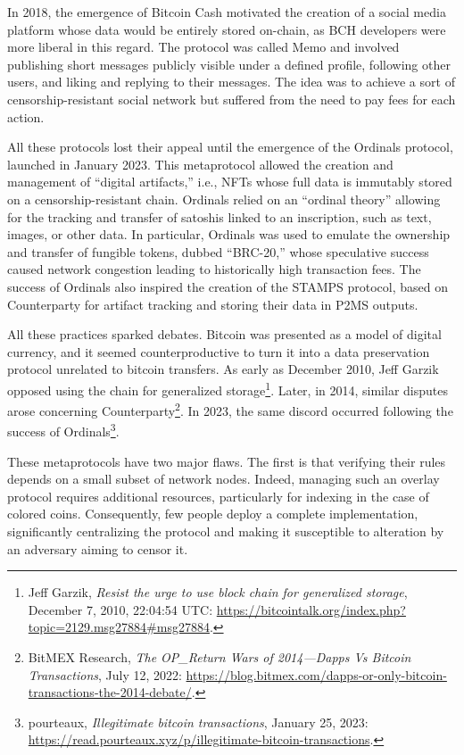 \documentclass[
  a5paper,
  smalldemyvopaper,10pt,twoside,onecolumn,openright,extrafontsizes,hidelinks]{memoir}
\begin{document}
In 2018, the emergence of Bitcoin Cash motivated the creation of a
social media platform whose data would be entirely stored on-chain, as
BCH developers were more liberal in this regard. The protocol was called
Memo and involved publishing short messages publicly visible under a
defined profile, following other users, and liking and replying to their
messages. The idea was to achieve a sort of censorship-resistant social
network but suffered from the need to pay fees for each action.

All these protocols lost their appeal until the emergence of the
Ordinals protocol, launched in January 2023. This metaprotocol allowed
the creation and management of ``digital artifacts,'' i.e., NFTs whose
full data is immutably stored on a censorship-resistant chain. Ordinals
relied on an ``ordinal theory'' allowing for the tracking and transfer
of satoshis linked to an inscription, such as text, images, or other
data. In particular, Ordinals was used to emulate the ownership and
transfer of fungible tokens, dubbed ``BRC-20,'' whose speculative
success caused network congestion leading to historically high
transaction fees. The success of Ordinals also inspired the creation of
the STAMPS protocol, based on Counterparty for artifact tracking and
storing their data in P2MS outputs.

All these practices sparked debates. Bitcoin was presented as a model of
digital currency, and it seemed counterproductive to turn it into a data
preservation protocol unrelated to bitcoin transfers. As early as
December 2010, Jeff Garzik opposed using the chain for generalized
storage\footnote{Jeff Garzik, \emph{Resist the urge to use block chain
  for generalized storage}, December 7, 2010, 22:04:54 UTC:
  \url{https://bitcointalk.org/index.php?topic=2129.msg27884\#msg27884}.}.
Later, in 2014, similar disputes arose concerning
Counterparty\footnote{BitMEX Research, \emph{The OP\_Return Wars of
  2014---Dapps Vs Bitcoin Transactions}, July 12, 2022:
  \url{https://blog.bitmex.com/dapps-or-only-bitcoin-transactions-the-2014-debate/}.}.
In 2023, the same discord occurred following the success of
Ordinals\footnote{pourteaux, \emph{Illegitimate bitcoin transactions},
  January 25, 2023:
  \url{https://read.pourteaux.xyz/p/illegitimate-bitcoin-transactions}.}.

These metaprotocols have two major flaws. The first is that verifying
their rules depends on a small subset of network nodes. Indeed, managing
such an overlay protocol requires additional resources, particularly for
indexing in the case of colored coins. Consequently, few people deploy a
complete implementation, significantly centralizing the protocol and
making it susceptible to alteration by an adversary aiming to censor it.
\end{document}
